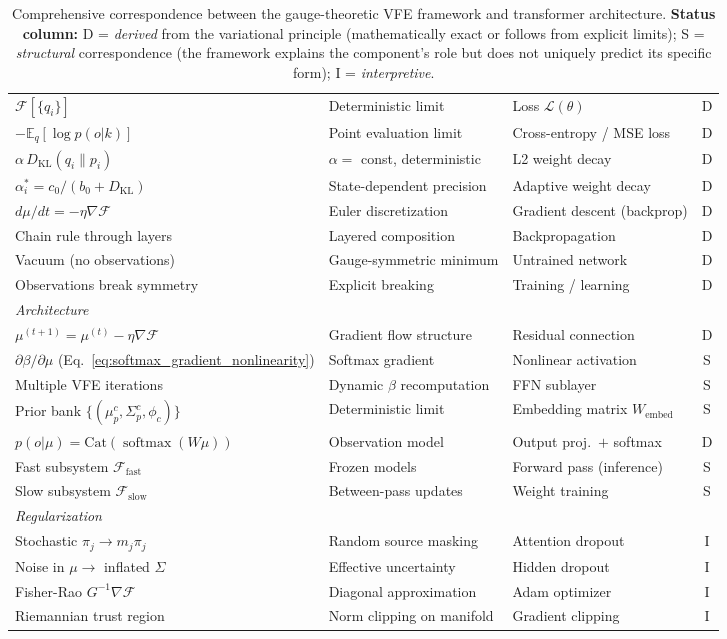 \documentclass[twoside,11pt]{article}
\newcommand{\softmax}{\operatorname{softmax}}
\newcommand{\KL}{\operatorname{KL}}
\begin{document}
\begin{table}[p]
\begin{tabular}{|l|l|l|c|}
$\mathcal{F}[\{q_i\}]$ & Deterministic limit & Loss $\mathcal{L}(\theta)$ & D \\
$-\mathbb{E}_q[\log p(o|k)]$ & Point evaluation limit & Cross-entropy / MSE loss & D \\
$\alpha\, D_{\KL}(q_i \| p_i)$ & $\alpha = $ const, deterministic & L2 weight decay & D \\
$\alpha_i^* \!=\! c_0/(b_0 + D_{\KL})$ & State-dependent precision & Adaptive weight decay & D \\
$d\mu/dt = -\eta\nabla\mathcal{F}$ & Euler discretization & Gradient descent (backprop) & D \\
Chain rule through layers & Layered composition & Backpropagation & D \\
Vacuum (no observations) & Gauge-symmetric minimum & Untrained network & D \\
Observations break symmetry & Explicit breaking & Training / learning & D \\
\hline
\multicolumn{4}{|l|}{\textit{Architecture}} \\
\hline
$\mu^{(t+1)} \!=\! \mu^{(t)} - \eta\nabla\mathcal{F}$ & Gradient flow structure & Residual connection & D \\
$\partial\beta/\partial\mu$ (Eq.~\ref{eq:softmax_gradient_nonlinearity}) & Softmax gradient & Nonlinear activation & S \\
Multiple VFE iterations & Dynamic $\beta$ recomputation & FFN sublayer & S \\
Prior bank $\{(\mu_p^c, \Sigma_p^c, \phi_c)\}$ & Deterministic limit & Embedding matrix $W_{\text{embed}}$ & S \\
$p(o|\mu) = \mathrm{Cat}(\softmax(W\mu))$ & Observation model & Output proj.\ $+$ softmax & D \\
Fast subsystem $\mathcal{F}_{\text{fast}}$ & Frozen models & Forward pass (inference) & S \\
Slow subsystem $\mathcal{F}_{\text{slow}}$ & Between-pass updates & Weight training & S \\
\hline
\multicolumn{4}{|l|}{\textit{Regularization}} \\
\hline
Stochastic $\pi_j \to m_j\pi_j$ & Random source masking & Attention dropout & I \\
Noise in $\mu \to$ inflated $\Sigma$ & Effective uncertainty & Hidden dropout & I \\
Fisher-Rao $G^{-1}\nabla\mathcal{F}$ & Diagonal approximation & Adam optimizer & I \\
Riemannian trust region & Norm clipping on manifold & Gradient clipping & I \\
\hline
\end{tabular}
\caption{Comprehensive correspondence between the gauge-theoretic VFE framework and transformer architecture. \textbf{Status column:} D = \emph{derived} from the variational principle (mathematically exact or follows from explicit limits); S = \emph{structural} correspondence (the framework explains the component's role but does not uniquely predict its specific form); I = \emph{interpretive}.}
\label{tab:fep_nn_correspondence}
\end{table}
\end{document}
